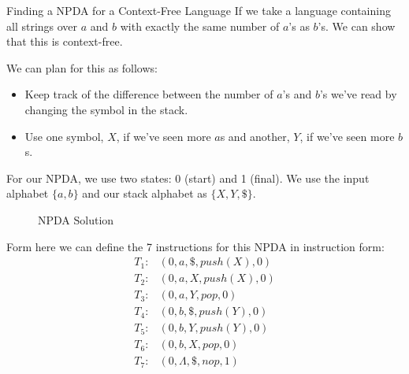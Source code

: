 \begin{example}{Finding a NPDA for a Context-Free Language}
If we take a language containing all strings over $a$ and $b$ with exactly the same number of $a$'s as $b$'s. We can show that this is context-free. 

We can plan for this as follows:
\begin{itemize}
    \item Keep track of the difference between the number of $a$'s and $b$'s we've read by changing the symbol in the stack.
    \item Use one symbol, $X$, if we've seen more $a$s and another, $Y$, if we've seen more $b$s.
\end{itemize}

For our NPDA, we use two states: 0 (start) and 1 (final). We use the input alphabet $\{a,b\}$ and our stack alphabet as $\{X, Y, \$\}$.

\begin{figure}[H]
    \centering
    \caption{NPDA Solution}
\end{figure}

Form here we can define the 7 instructions for this NPDA in instruction form:
\begin{align*}
T_1: & (0,a,\$, push(X), 0)\\
T_2: & (0, a, X, push(X), 0)\\
T_3: & (0, a, Y, pop, 0)\\
T_4: & (0, b, \$, push(Y), 0)\\
T_5: & (0, b, Y, push(Y), 0)\\
T_6: & (0, b, X, pop, 0)\\
T_7: & (0, \Lambda, \$, nop, 1)
\end{align*}


\end{example}
